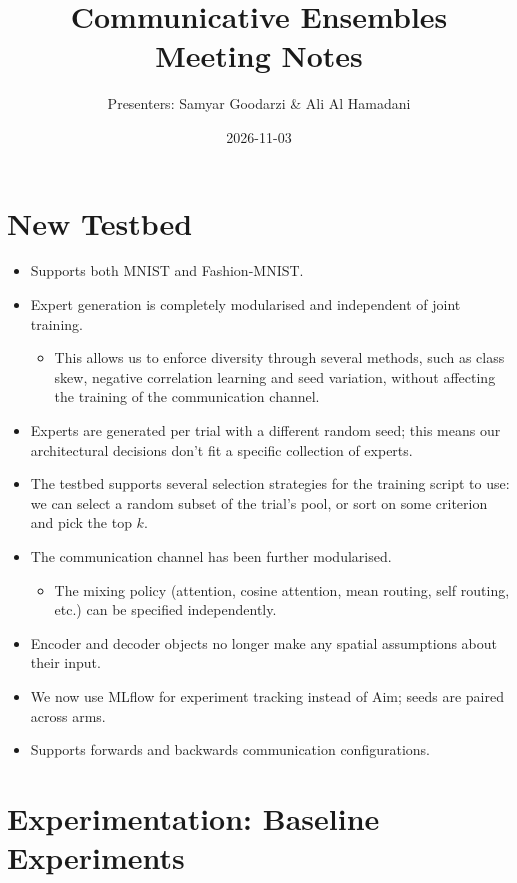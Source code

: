 \documentclass[11pt,a4paper]{article}
\title{Communicative Ensembles\\[0.3ex] \large Meeting Notes}
\author{Presenters: Samyar Goodarzi \& Ali Al Hamadani}
\date{2026-11-03}
\begin{document}
\maketitle

\section{New Testbed}

\begin{itemize}
  \item Supports both MNIST and Fashion-MNIST.
  \item Expert generation is completely modularised and independent of joint training.
    \begin{itemize}
      \item This allows us to enforce diversity through several methods, such as class skew,
            negative correlation learning and seed variation, without affecting the training
            of the communication channel.
    \end{itemize}
  \item Experts are generated per trial with a different random seed; this means our
        architectural decisions don't fit a specific collection of experts.
  \item The testbed supports several selection strategies for the training script to use: we can
        select a random subset of the trial's pool, or sort on some criterion and pick the top $k$.
  \item The communication channel has been further modularised.
    \begin{itemize}
      \item The mixing policy (attention, cosine attention, mean routing, self routing, etc.) can
            be specified independently.
    \end{itemize}
  \item Encoder and decoder objects no longer make any spatial assumptions about their input.
  \item We now use MLflow for experiment tracking instead of Aim; seeds are paired across arms.
  \item Supports forwards and backwards communication configurations.
\end{itemize}

\section{Experimentation: Baseline Experiments}
\end{document}
